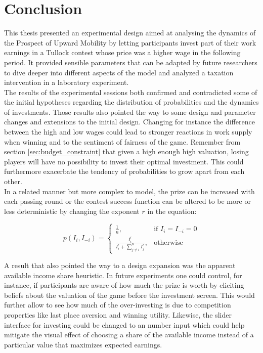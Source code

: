 \chapter{Conclusion}
\label{ch:conclusion}
\thispagestyle{fancy}

This thesis presented an experimental design aimed at analysing the dynamics of the Prospect of Upward Mobility by letting participants invest part of their work earnings in a Tullock contest whose price was a higher wage in the following period. It provided sensible parameters that can be adapted by future researchers to dive deeper into different aspects of the model and analyzed a taxation intervention in a laboratory experiment.\\

The results of the experimental sessions both confirmed and contradicted some of the initial hypotheses regarding the distribution of probabilities and the dynamics of investments. Those results also pointed the way to some design and parameter changes and extensions to the initial design. Changing for instance the difference between the high and low wages could lead to stronger reactions in work supply when winning and to the sentiment of fairness of the game. Remember from section \ref{sec:budget_constraint} that given a high enough high valuation, losing players will have no possibility to invest their optimal investment. This could furthermore exacerbate the tendency of probabilities to grow apart from each other.\\

In a related manner but more complex to model, the prize can be increased with each passing round or the contest success function can be altered to be more or less deterministic by changing the exponent $r$ in the equation:

\begin{equation}
    p(I_i,I_{-i}) =
\begin{cases}
    \frac{1}{n},& \text{if } I_i = I_{-i} = 0\\
    \frac{I_i^r}{I_i^r + \sum_{j\neq i}^n I_{j}^r},              & \text{otherwise}
\end{cases}
\label{eq:csf_exp}    
\end{equation}

A result that also pointed the way to a design expansion was the apparent available income share heuristic. In future experiments one could control, for instance, if participants are aware of how much the prize is worth by eliciting beliefs about the valuation of the game before the investment screen. This would further allow to see how much of the over-investing is due to competition properties like last place aversion and winning utility. Likewise, the slider interface for investing could be changed to an number input which could help mitigate the visual effect of choosing a share of the available income instead of a particular value that maximizes expected earnings.\\

